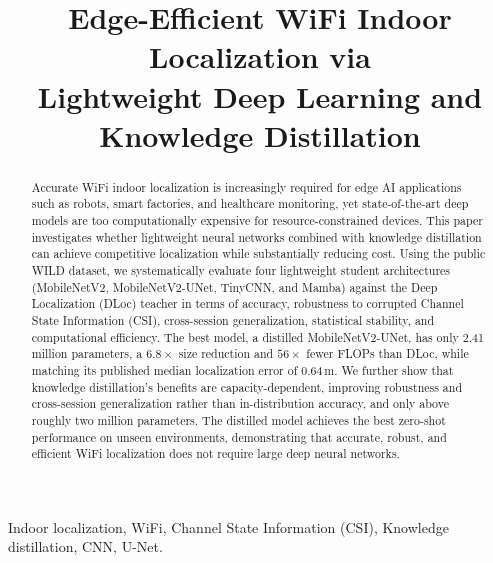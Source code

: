 \documentclass[conference,a4paper]{IEEEtran}
\newif\ifanonymous
\begin{document}
\title{Edge-Efficient WiFi Indoor Localization via\\ Lightweight Deep Learning and Knowledge Distillation}

\ifanonymous
\author{\IEEEauthorblockN{Anonymous submission}\IEEEauthorblockA{Paper submitted to NILES 2026 for double-blind review}}
\else
\author{%
}
\fi

\maketitle

\begin{abstract}
Accurate WiFi indoor localization is increasingly required for edge AI applications such as robots, smart factories, and healthcare monitoring, yet state-of-the-art deep models are too computationally expensive for resource-constrained devices. This paper investigates whether lightweight neural networks combined with knowledge distillation can achieve competitive localization while substantially reducing cost. Using the public WILD dataset, we systematically evaluate four lightweight student architectures (MobileNetV2, MobileNetV2-UNet, TinyCNN, and Mamba) against the Deep Localization (DLoc) teacher in terms of accuracy, robustness to corrupted Channel State Information (CSI), cross-session generalization, statistical stability, and computational efficiency. The best model, a distilled MobileNetV2-UNet, has only 2.41 million parameters, a $6.8\times$ size reduction and $56\times$ fewer FLOPs than DLoc, while matching its published median localization error of 0.64\,m. We further show that knowledge distillation's benefits are capacity-dependent, improving robustness and cross-session generalization rather than in-distribution accuracy, and only above roughly two million parameters. The distilled model achieves the best zero-shot performance on unseen environments, demonstrating that accurate, robust, and efficient WiFi localization does not require large deep neural networks.
\end{abstract}

\begin{IEEEkeywords}
Indoor localization, WiFi, Channel State Information (CSI), Knowledge distillation, CNN, U-Net.
\end{IEEEkeywords}
\end{document}
